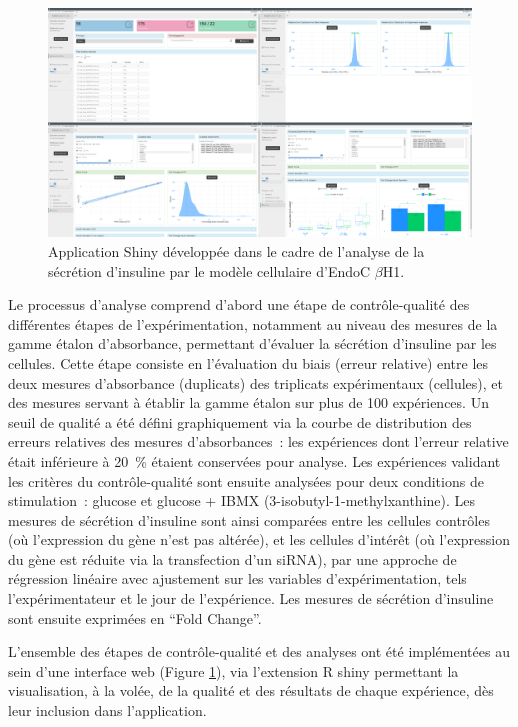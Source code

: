\documentclass[11pt,a4paper,notrimn]{krantz}
\theoremstyle{definition}
\theoremstyle{definition}
\theoremstyle{remark}
\begin{document}
\begin{figure}[!htb]

{\centering \includegraphics[width=6in]{FiguresTables/App1} 

}

\caption{Application Shiny développée dans le cadre de l'analyse de la
sécrétion d'insuline par le modèle cellulaire d'EndoC \(\beta\)H1.}\label{fig:App1}
\end{figure}

Le processus d'analyse comprend d'abord une étape de contrôle-qualité
des différentes étapes de l'expérimentation, notamment au niveau des
mesures de la gamme étalon d'absorbance, permettant d'évaluer la
sécrétion d'insuline par les cellules. Cette étape consiste en
l'évaluation du biais (erreur relative) entre les deux mesures
d'absorbance (duplicats) des triplicats expérimentaux (cellules), et des
mesures servant à établir la gamme étalon sur plus de 100 expériences.
Un seuil de qualité a été défini graphiquement via la courbe de
distribution des erreurs relatives des mesures d'absorbances~: les
expériences dont l'erreur relative était inférieure à 20~\% étaient
conservées pour analyse. Les expériences validant les critères du
contrôle-qualité sont ensuite analysées pour deux conditions de
stimulation~: glucose et glucose + IBMX (3-isobutyl-1-methylxanthine).
Les mesures de sécrétion d'insuline sont ainsi comparées entre les
cellules contrôles (où l'expression du gène n'est pas altérée), et les
cellules d'intérêt (où l'expression du gène est réduite via la
transfection d'un siRNA), par une approche de régression linéaire avec
ajustement sur les variables d'expérimentation, tels l'expérimentateur
et le jour de l'expérience. Les mesures de sécrétion d'insuline sont
ensuite exprimées en ``Fold Change''.

L'ensemble des étapes de contrôle-qualité et des analyses ont été
implémentées au sein d'une interface web (Figure \ref{fig:App1}), via
l'extension R shiny \citep{R-shiny} permettant la visualisation, à la
volée, de la qualité et des résultats de chaque expérience, dès leur
inclusion dans l'application.
\end{document}
